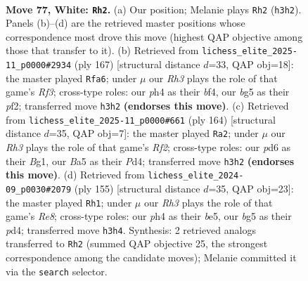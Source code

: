 \documentclass[11pt]{article}
\begin{document}
\clearpage

\begin{figure}[p]\centering
\begin{subfigure}{0.46\textwidth}\centering
\resizebox{\linewidth}{!}{%
\newchessgame
\chessboard[
  setfen={8/1r6/3p1k1p/B3p1b1/n3P2p/3K1P1R/8/8 w - - 2 77},
  showmover=false,
  pgfstyle=straightmove, color=movearrow, markmove={h3-h2}
]}
\caption{}
\end{subfigure}\hfill
\begin{subfigure}{0.46\textwidth}\centering
\resizebox{\linewidth}{!}{%
\newchessgame
\chessboard[
  setfen={8/8/5rp1/7p/r4B1P/3k2P1/5PK1/2R5 b - - 53 84},
  showmover=false,
  pgfstyle=straightmove, color=movearrow, markmove={f6-a6}
]}
\caption{}
\end{subfigure}
\\[4pt]
\begin{subfigure}{0.46\textwidth}\centering
\resizebox{\linewidth}{!}{%
\newchessgame
\chessboard[
  setfen={1r6/8/5pk1/3p2p1/3P3p/p1K4P/5RP1/2b3B1 w - - 10 83},
  showmover=false,
  pgfstyle=straightmove, color=movearrow, markmove={f2-a2}
]}
\caption{}
\end{subfigure}\hfill
\begin{subfigure}{0.46\textwidth}\centering
\resizebox{\linewidth}{!}{%
\newchessgame
\chessboard[
  setfen={8/7P/8/3pB1R1/2kP2p1/6P1/5PK1/4r3 b - - 0 78},
  showmover=false,
  pgfstyle=straightmove, color=movearrow, markmove={e1-h1}
]}
\caption{}
\end{subfigure}
\caption{\textbf{Move 77, White: \texttt{Rh2}.} (a) Our position; Melanie plays \texttt{Rh2} (\texttt{h3h2}). Panels (b)--(d) are the retrieved master positions whose correspondence most drove this move (highest QAP objective among those that transfer to it). (b) Retrieved from \texttt{lichess\_elite\_2025-11\_p0000\#2934} (ply 167) [structural distance $d$=33, QAP obj=18]: the master played \texttt{Rfa6}; under $\mu$ our \emph{Rh3} plays the role of that game's \emph{Rf3}; cross-type roles: our \emph{p}h4 as their \emph{b}f4, our \emph{b}g5 as their \emph{p}f2; transferred move \texttt{h3h2} \textbf{(endorses this move)}. (c) Retrieved from \texttt{lichess\_elite\_2025-11\_p0000\#661} (ply 164) [structural distance $d$=35, QAP obj=7]: the master played \texttt{Ra2}; under $\mu$ our \emph{Rh3} plays the role of that game's \emph{Rf2}; cross-type roles: our \emph{p}d6 as their \emph{B}g1, our \emph{B}a5 as their \emph{P}d4; transferred move \texttt{h3h2} \textbf{(endorses this move)}. (d) Retrieved from \texttt{lichess\_elite\_2024-09\_p0030\#2079} (ply 155) [structural distance $d$=35, QAP obj=23]: the master played \texttt{Rh1}; under $\mu$ our \emph{Rh3} plays the role of that game's \emph{Re8}; cross-type roles: our \emph{p}h4 as their \emph{b}e5, our \emph{b}g5 as their \emph{p}d4; transferred move \texttt{h3h4}. Synthesis: 2 retrieved analogs transferred to \texttt{Rh2} (summed QAP objective 25, the strongest correspondence among the candidate moves); Melanie committed it via the \texttt{search} selector.}
\label{fig:thought-m152}
\end{figure}
\end{document}
